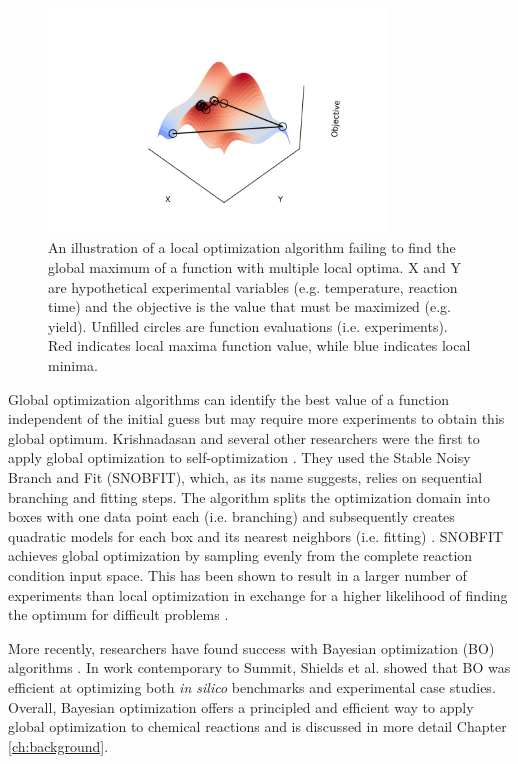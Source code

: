 \begin{figure}
    \centering
    \includegraphics[width=0.8\textwidth]{gfx/Chapter03/local_optimzation.png}
    \caption{An illustration of a local optimization algorithm failing to find the global maximum of a function with multiple local optima. X and Y are hypothetical experimental variables (e.g. temperature, reaction time) and the objective is the value that must be maximized (e.g. yield). Unfilled circles are function evaluations (i.e. experiments). Red indicates local maxima function value, while blue indicates local minima.}
    \label{fig:local-optimization}
\end{figure}
 
Global optimization algorithms can identify the best value of a function independent of the initial guess but may require more experiments to obtain this global optimum. Krishnadasan and several other researchers were the first to apply global optimization to self-optimization \cite{Holmes2016b, Krishnadasan2007, McMullen2010a}. They used the Stable Noisy Branch and Fit (SNOBFIT), which, as its name suggests, relies on sequential branching and fitting steps. The algorithm splits the optimization domain into boxes with one data point each (i.e. branching) and subsequently creates  quadratic models for each box and its nearest neighbors (i.e. fitting) \cite{Huyer2008}. SNOBFIT achieves global optimization by sampling evenly from the complete reaction condition input space. This has been shown to result in a larger number of experiments than local optimization in exchange for a higher likelihood of finding the optimum for difficult problems \cite{McMullen2010a}.

More recently, researchers have found success with Bayesian optimization (BO) algorithms \cite{Schweidtmann2018, Amar2019, Hase2020, Shields2021, Manson2021}. In work contemporary to Summit, Shields et al. showed that BO was efficient at optimizing both \textit{in silico} benchmarks and experimental case studies. Overall, Bayesian optimization offers a principled and efficient way to apply global optimization to chemical reactions and is discussed in more detail   Chapter \ref{ch:background}.

